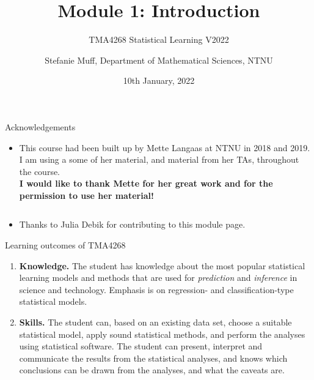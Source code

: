 \documentclass[10pt,ignorenonframetext,]{beamer}
\title{Module 1: Introduction}
\subtitle{TMA4268 Statistical Learning V2022}
\author{Stefanie Muff, Department of Mathematical Sciences, NTNU}
\date{10th January, 2022}
\providecommand{\tightlist}{%
  \setlength{\itemsep}{0pt}\setlength{\parskip}{0pt}}
\begin{document}
\frame{\titlepage}

\begin{frame}{Acknowledgements}
\protect\hypertarget{acknowledgements}{}

\begin{itemize}
\tightlist
\item
  This course had been built up by Mette Langaas at NTNU in 2018 and
  2019. I am using a some of her material, and material from her TAs,
  throughout the course.\\
  \vspace{2mm} \textbf{I would like to thank Mette for her great work
  and for the permission to use her material!}
\end{itemize}

\(~\)

\begin{itemize}
\tightlist
\item
  Thanks to Julia Debik for contributing to this module page.
\end{itemize}

\end{frame}

\begin{frame}{Learning outcomes of TMA4268}
\protect\hypertarget{learning-outcomes-of-tma4268}{}

\begin{enumerate}
\item
  \textbf{Knowledge.} The student has knowledge about the most popular
  statistical learning models and methods that are used for
  \emph{prediction} and \emph{inference} in science and technology.
  Emphasis is on regression- and classification-type statistical models.
\item
  \textbf{Skills.} The student can, based on an existing data set,
  choose a suitable statistical model, apply sound statistical methods,
  and perform the analyses using statistical software. The student can
  present, interpret and communicate the results from the statistical
  analyses, and knows which conclusions can be drawn from the analyses,
  and what the caveats are.
\end{enumerate}

\end{frame}
\end{document}
